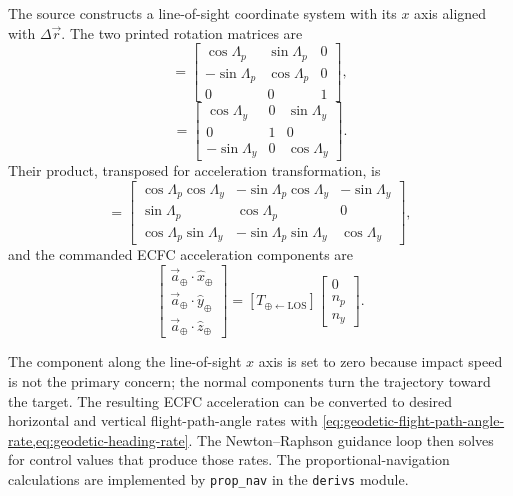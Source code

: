 The source constructs a line-of-sight coordinate system with its $x$ axis aligned
with $\Delta\vec r$. The two printed rotation matrices are
\begin{equation}
  [R_p]=
  \begin{bmatrix}
    \cos\Lambda_p & \sin\Lambda_p & 0\\
    -\sin\Lambda_p & \cos\Lambda_p & 0\\
    0 & 0 & 1
  \end{bmatrix},
  \label{eq:source-los-pitch-rotation}
\end{equation}
\begin{equation}
  [R_y]=
  \begin{bmatrix}
    \cos\Lambda_y & 0 & \sin\Lambda_y\\
    0 & 1 & 0\\
    -\sin\Lambda_y & 0 & \cos\Lambda_y
  \end{bmatrix}.
  \label{eq:source-los-yaw-rotation}
\end{equation}
Their product, transposed for acceleration transformation, is
\begin{equation}
  [T_{\oplus\leftarrow\mathrm{LOS}}]=
  \begin{bmatrix}
    \cos\Lambda_p\cos\Lambda_y & -\sin\Lambda_p\cos\Lambda_y & -\sin\Lambda_y\\
    \sin\Lambda_p & \cos\Lambda_p & 0\\
    \cos\Lambda_p\sin\Lambda_y & -\sin\Lambda_p\sin\Lambda_y & \cos\Lambda_y
  \end{bmatrix},
  \label{eq:los-to-ecfc-acceleration-matrix}
\end{equation}
and the commanded ECFC acceleration components are
\begin{equation}
  \begin{bmatrix}
    \vec a_{\oplus}\cdot\hat x_{\oplus}\\
    \vec a_{\oplus}\cdot\hat y_{\oplus}\\
    \vec a_{\oplus}\cdot\hat z_{\oplus}
  \end{bmatrix}
  =[T_{\oplus\leftarrow\mathrm{LOS}}]
  \begin{bmatrix}0\\n_p\\n_y\end{bmatrix}.
  \label{eq:proportional-navigation-ecfc-acceleration}
\end{equation}

The component along the line-of-sight $x$ axis is set to zero because impact speed
is not the primary concern; the normal components turn the trajectory toward the
target. The resulting ECFC acceleration can be converted to desired horizontal and
vertical flight-path-angle rates with
\cref{eq:geodetic-flight-path-angle-rate,eq:geodetic-heading-rate}. The
Newton--Raphson guidance loop then solves for control values that produce those
rates. The proportional-navigation calculations are implemented by
\texttt{prop\_nav} in the \texttt{derivs} module.
